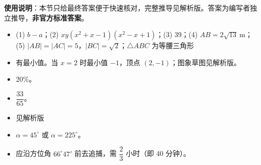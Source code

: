 
\begin{gknotice}
\textbf{使用说明}：本节只给最终答案便于快速核对，完整推导见解析版。答案为编写者独立推导，\textbf{非官方标准答案}。
\end{gknotice}

\begin{itemize}[leftmargin=2.6em]
  \item[\textbf{1.}] (1) $b-a$；(2) $xy(x^2+x-1)(x^2-x+1)$；(3) $39$；(4) $AB=2\sqrt{13}\ \mathrm{m}$；(5) $|AB|=|AC|=5$，$|BC|=\sqrt2$；$\triangle ABC$ 为等腰三角形
  \item[\textbf{2.}] 有最小值。当 $x=2$ 时最小值 $-1$，顶点 $(2,-1)$；图象草图见解析版。
  \item[\textbf{3.}] $20\%$。
  \item[\textbf{4.}] $\dfrac{33}{65}$。
  \item[\textbf{5.}] 见解析版
  \item[\textbf{6.}] $\alpha=45^\circ$ 或 $\alpha=225^\circ$。
  \item[\textbf{7.}] 应沿方位角 $66^\circ47'$ 前去追捕，需 $\dfrac23$ 小时（即 40 分钟）。
\end{itemize}
